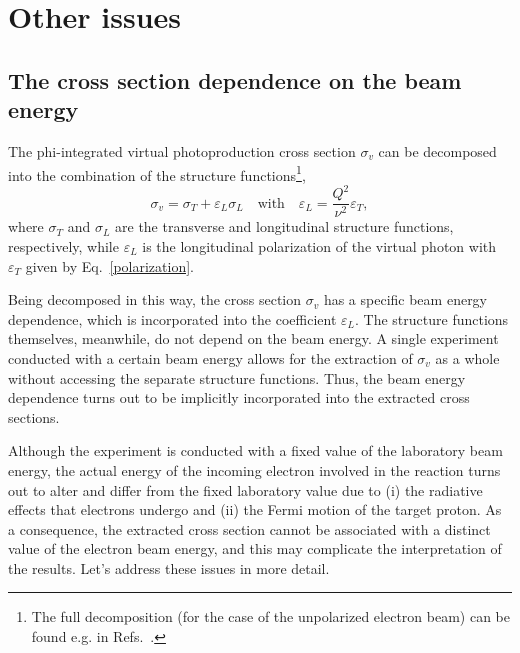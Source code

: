 \chapter{Other issues}
\label{Sect:issues}


\section{The cross section dependence on the beam energy}


The phi-integrated virtual photoproduction cross section $\sigma_{v}$ can be decomposed into the combination of the structure functions\footnote[1]{The full decomposition (for the case of the unpolarized electron beam) can be found e.g. in Refs.~\cite{twopeg,Skorodumina:2016pnb}.},
\begin{equation}
\sigma_{v} = \sigma_{T} + \varepsilon_{L}\sigma_{L}\text{~~~with~~~}\varepsilon_{L}=\frac{Q^{2}}{\nu^{2}}\varepsilon_{T},\label{eq:beam_en_dep}
\end{equation}
where $\sigma_{T}$ and $\sigma_{L}$ are the transverse and longitudinal structure functions, respectively, while $\varepsilon_{L}$ is the longitudinal polarization of the virtual photon with $\varepsilon_{T}$ given by Eq.~\eqref{polarization}.

Being decomposed in this way, the cross section $\sigma_{v}$ has a specific beam energy dependence, which is incorporated into the coefficient $\varepsilon_{L}$. The structure functions themselves, meanwhile, do not depend on the beam energy. A single experiment conducted with a certain beam energy allows for the extraction of $\sigma_{v}$ as a whole without accessing the separate structure functions. Thus, the beam energy dependence turns out to be implicitly incorporated into the extracted cross sections.

Although the experiment is conducted with a fixed value of the laboratory beam energy, the actual energy of the incoming electron involved in the reaction turns out to alter and differ from the fixed laboratory value due to  (i) the radiative effects that electrons undergo and (ii) the Fermi motion of the target proton. As a consequence, the extracted cross section cannot be associated with a distinct value of the electron beam energy, and this may complicate the interpretation of the results. Let's address these issues in more detail. 

